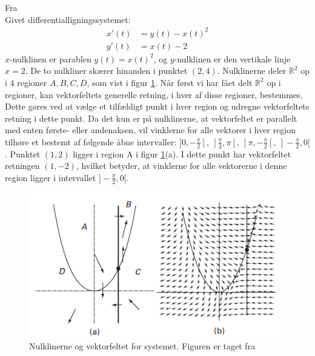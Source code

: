\begin{Example}\textnormal{Fra \citep[s. 191]{Hirsch}}\\
\textnormal{Givet differentialligningssystemet:}
\begin{align*}
    x'(t)&=y(t)-x(t)^2 \\
    y'(t)&=x(t)-2
\end{align*}
\textnormal{$x$-nulklinen er parablen $y(t)=x(t)^2$, og $y$-nulklinen er den vertikale linje $x=2$. De to nulkliner skærer hinanden i punktet $(2,4)$. Nulklinerne deler $\mathbb{R}^2$ op i 4 regioner $A,B,C,D$, som vist i figur \ref{nulkliner}. Når først vi har fået delt $\mathbb{R}^2$ op i regioner, kan vektorfeltets generelle retning, i hver af disse regioner, bestemmes. Dette gøres ved at vælge et tilfældigt punkt i hver region og udregne vektorfeltets retning i dette punkt. Da det kun er på nulklinerne, at vektorfeltet er parallelt med enten første- eller andenaksen, vil vinklerne for alle vektorer i hver region tilhøre et bestemt af følgende åbne intervaller: $]0,-\frac{\pi}{2}[, \ ]\frac{\pi}{2},\pi[,\ ]\pi,-\frac{\pi}{2}[,\ ]-\frac{\pi}{2},0[$. Punktet $(1,2)$ ligger i region A i figur \ref{nulkliner}(a). I dette punkt har vektorfeltet retningen $(1,-2)$, hvilket betyder, at vinklerne for alle vektorerne i denne region ligger i intervallet $]-\frac{\pi}{2},0[$.}

\begin{figure} [H]
    \centering
    \includegraphics[scale=0.8]{Images/nulkliner.png}
    \caption{Nulklinerne og vektorfeltet for systemet. Figuren er taget fra \citep[s. 191]{Hirsch}}
    \label{nulkliner}
\end{figure}
\end{Example}